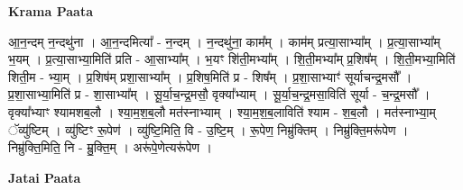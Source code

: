 \documentclass[17pt]{extarticle}
\begin{document}
\textbf{Krama Paata} \newline

आ॒न॒न्दम् न॒न्दथु॑ना । आ॒न॒न्दमित्या᳚ - न॒न्दम् । न॒न्दथु॑ना॒ काम᳚म् । काम॑म् प्रत्या॒साभ्या᳚म् । प्र॒त्या॒साभ्या᳚म् भ॒यम् । प्र॒त्या॒साभ्या॒मिति॑ प्रति - आ॒साभ्या᳚म् । भ॒यꣳ शि॑ती॒मभ्या᳚म् । शि॒ती॒मभ्या᳚म् प्र॒शिष᳚म् । शि॒ती॒मभ्या॒मिति॑ शिती॒म - भ्या॒म् । प्र॒शिष॑म् प्रशा॒साभ्या᳚म् । प्र॒शिष॒मिति॑ प्र - शिष᳚म् । प्र॒शा॒साभ्याꣳ॑ सूर्याचन्द्र॒मसौ᳚ । प्र॒शा॒साभ्या॒मिति॑ प्र - शा॒साभ्या᳚म् । सू॒र्या॒च॒न्द्र॒मसौ॒ वृक्या᳚भ्याम् । सू॒र्या॒च॒न्द्र॒मसा॒विति॑ सूर्या - च॒न्द्र॒मसौ᳚ । वृक्या᳚भ्याꣳ श्यामशब॒लौ । श्या॒म॒श॒ब॒लौ मत॑स्नाभ्याम् । श्या॒म॒श॒ब॒लाविति॑ श्याम - श॒ब॒लौ । मत॑स्नाभ्या॒म् ॅव्यु॑ष्टिम् । व्यु॑ष्टिꣳ रू॒पेण॑ । व्यु॑ष्टि॒मिति॒ वि - उ॒ष्टि॒म् । रू॒पेण॒ निम्रु॑क्तिम् । निम्रु॑क्ति॒मरू॑पेण । निम्रु॑क्ति॒मिति॒ नि - म्रु॒क्ति॒म् । अरू॑पे॒णेत्यरू॑पेण । \newline

\textbf{Jatai Paata} \newline
\end{document}
